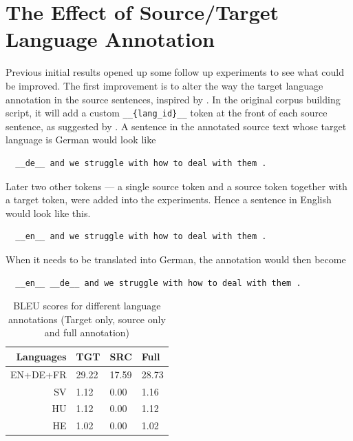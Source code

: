 \documentclass[thesis,fonts=libertine]{cluu}
\begin{document}
\section{The Effect of Source/Target Language Annotation}

Previous initial results opened up some follow up experiments to see what could be improved. The first improvement is to alter the way the target language annotation in the source sentences, inspired by \textcite{Blackwood:2018aa}. In the original corpus building script, it will add a custom \verb|__{lang_id}__| token at the front of each source sentence, as suggested by \textcite{Johnson:2016aa}. A sentence in the annotated source text whose target language is German would look like 

\begin{verbatim}
  __de__ and we struggle with how to deal with them .
\end{verbatim}

Later two other tokens --- a single source token and a source token together with a target token, were added into the experiments. Hence a sentence in English would look like this. 

\begin{verbatim}
  __en__ and we struggle with how to deal with them .
\end{verbatim}

When it needs to be translated into German, the annotation would then become 

\begin{verbatim}
  __en__ __de__ and we struggle with how to deal with them .
\end{verbatim}

\begin{table}
  \centering
  \begin{tabular}{|r*{3}{|l}|}
  \hline
  Languages & TGT & SRC & Full \\
  \hline\hline
  EN+DE+FR & 29.22 & 17.59 & 28.73 \\
  \hline
  SV & 1.12 & 0.00 & 1.16 \\
  \hline
  HU & 1.12 & 0.00 & 1.12 \\
  \hline
  HE & 1.02 & 0.00 & 1.02 \\
  \hline
  \end{tabular}
  \caption{BLEU scores for different language annotations (Target only, source only and full annotation)}
  \label{table:altering_lang_id}
\end{table}
\end{document}
